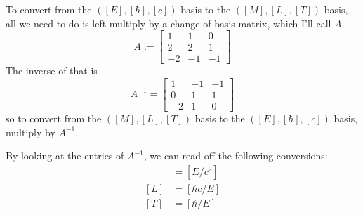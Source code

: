 \documentclass[12pt]{article}
\begin{document}
To convert from the $([E], [\hbar], [c])$ basis to the $([M], [L], [T])$ basis, all we need to do is left multiply by a change-of-basis matrix, which I'll call $A$.
\[A := \begin{bmatrix}
    1 & 1 & 0 \\
    2 & 2 & 1 \\
    -2 & -1 & -1
\end{bmatrix} \]
The inverse of that is
\[ A^{-1} = \begin{bmatrix}
    1 & -1 & -1 \\
    0 & 1 & 1 \\
    -2 & 1 & 0
\end{bmatrix} \]
so to convert from the $([M], [L], [T])$ basis to the $([E], [\hbar], [c])$ basis, multiply by $A^{-1}$.
\par
By looking at the entries of $A^{-1}$, we can read off the following conversions:
\begin{align*}
    [M] &= [E/c^2] \\
    [L] &= [\hbar c / E] \\
    [T] &= [\hbar / E]
\end{align*}
\end{document}
